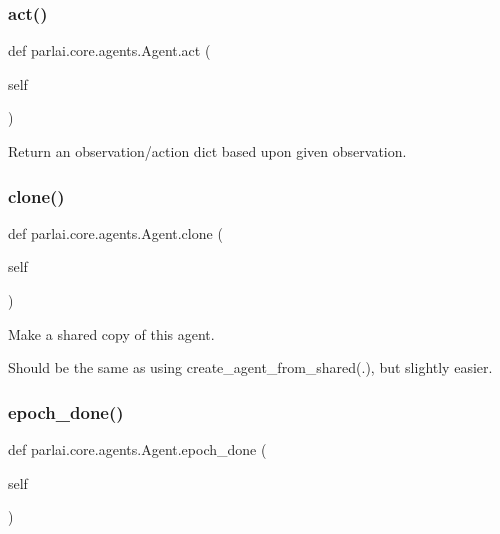 \subsubsection{\texorpdfstring{act()}{act()}}
{\footnotesize\ttfamily def parlai.\+core.\+agents.\+Agent.\+act (\begin{DoxyParamCaption}\item[{}]{self }\end{DoxyParamCaption})}

\begin{DoxyVerb}Return an observation/action dict based upon given observation.
\end{DoxyVerb}
 \mbox{\label{classparlai_1_1core_1_1agents_1_1Agent_a2525db5bdd19a3bf5b0669bfa158f9ff}} 
\subsubsection{\texorpdfstring{clone()}{clone()}}
{\footnotesize\ttfamily def parlai.\+core.\+agents.\+Agent.\+clone (\begin{DoxyParamCaption}\item[{}]{self }\end{DoxyParamCaption})}

\begin{DoxyVerb}Make a shared copy of this agent.

Should be the same as using create_agent_from_shared(.), but slightly easier.
\end{DoxyVerb}
 \mbox{\label{classparlai_1_1core_1_1agents_1_1Agent_a40157e237ea85d75ebc3fd248c7a1a1b}} 
\subsubsection{\texorpdfstring{epoch\+\_\+done()}{epoch\_done()}}
{\footnotesize\ttfamily def parlai.\+core.\+agents.\+Agent.\+epoch\+\_\+done (\begin{DoxyParamCaption}\item[{}]{self }\end{DoxyParamCaption})}

